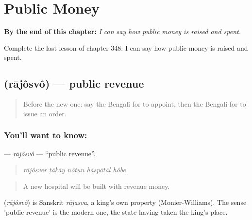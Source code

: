 
\chapter{Public Money}
\label{ch:bn-public-money}

\begin{chapteropening}
\textbf{By the end of this chapter:} \emph{I can say how public money is raised and spent.}

Complete the last lesson of chapter 348: I can say how public money is raised and spent.
\end{chapteropening}

\section[\texorpdfstring{\bn{রাজস্ব} (rājôsvô)}{রাজস্ব (rājôsvô)}]{ (rājôsvô) — public revenue}

\label{lesson:BN-C348-rajosvo}



\begin{quote}
Before the new one: say the Bengali for to appoint, then the Bengali for to issue an order.
\end{quote}

\subsection*{You'll want to know: }
\textbf{} — \emph{rājôsvô} — \textquotedblleft{}public revenue\textquotedblright{}.

\begin{quote}
    
\end{quote}

\begin{quote}
\emph{rājôsver ṭākāy nôtun hāspātāl hôbe.}
\end{quote}

\begin{quote}
A new hospital will be built with revenue money.
\end{quote}

\begin{cousinweb}
\textbf{} (\emph{rājôsvô}) is Sanskrit \emph{rājasva}, a king's own property (Monier-Williams). The sense 'public revenue' is the modern one, the state having taken the king's place.
\end{cousinweb}

